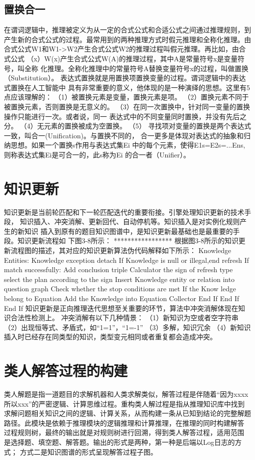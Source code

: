 \documentclass{standalone}
\begin{document}
\subsection{置换合一}
在谓词逻辑中，推理被定义为从一定的合式公式和合适公式之间通过推理规则，到
产生新的合式公式的过程。最常用到的两种推理方式时假元推理和全称化推理。由
合式公式W1和W1->W2产生合式公式W2的推理过程叫假元推理。再比如，由合式公式
（x）W(x)产生合式公式W(A)的推理过程，其中A是常量符号x是变量符号，叫全称
化推理。全称化推理中的常量符号A替换变量符号x的过程，叫做置换（Substitution）。
表达式置换就是用置换项置换变量的过程。谓词逻辑中的表达式置换在人工智能中
具有非常重要的意义，他体现的是一种演绎的思想。这里有5点应该理解的：
（1）被置换元素是变量，置换元素是项。
（2）置换元素不同于被置换元素，否则置换是无意义的。
（3）在同一次置换中，针对同一变量的置换操作只能进行一次。或者说，同一
表达式中的不同变量同时置换，并没有先后之分。
（4）无元素的置换被成为空置换。
（5）
寻找项对变量的置换是两个表达式一致，叫合一(Unification)。与置换不同的，
合一更多是体现对表达式的抽象和归纳思想。如果一个置换s作用与表达式集{Ei}
中的每个元素，使得E1s=E2s=...Ens,则称表达式集{Ei}是可合一的，此s称为{Ei}
的合一者（Unifier）。
\section{知识更新}
知识更新是当前轮匹配和下一轮匹配迭代的重要衔接。引擎处理知识更新的技术手段，
知识插入、冲突消解、更新回代、自动停机等。知识插入是对实例化规则产生的新知识
插入到原有的题目知识图谱中，是知识更新最基础也是最重要的手段。知识更新流程如
下图3-8所示：
*****************
根据图3-8所示的知识更新流程图的描述，其对应的知识更新算法伪代码解释如下所示：
Knowledge Entities:
	Knowledge exception detach
	If Knowledge is null or illegal,end refresh
	If match successfully:
		Add conclusion triple
		Calculator the sign of refresh type
			select the plan according to the sign
			Insert Knowledge entity or relation into question graph
			Check whether the stop conditions are met
			If the Know
			ledge belong to Equation
				Add the Knowledge into Equation Collector
			End If
	End If
End If
知识更新是正向推理迭代思想至关重要的环节，算法中冲突消解体现在知识合法性检测上。
冲突消解有以下几种情景：
（1）新知识为空或者空字符串
（2）出现恒等式、矛盾式，如“1=1”，“1=-1”
（3）多解，知识冗余
（4）新知识插入时已经存在同类型的知识，类型变元相同或者重复都会造成冲突。
\section{类人解答过程的构建}
类人解题是指一道题目的求解机器和人类求解类似，解答过程是伴随着“因为xxxx
所以xxx”的严密逻辑、计算思维过程。重构类人解过程是指从推理知识库中找到
求解问题相关知识之间的逻辑、计算关系，从而构建一条从已知到结论的完整解题
路径。此模块是依赖于推理模块的逻辑推理和计算推理，在推理的同时构建解答
过程规则树，最终的输出就是对规则树进行回溯，得到类人解答过程，适用范围
是选择题、填空题、解答题。输出的形式是两种，第一种是后端以Log日志的方式；
方式二是知识图谱的形式呈现解答过程子图。	
\end{document}
